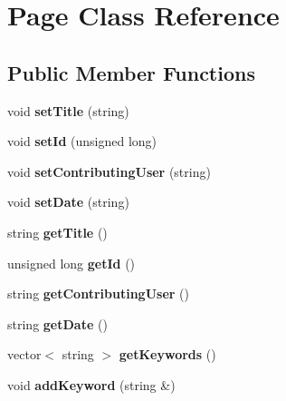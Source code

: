 \hypertarget{class_page}{\section{Page Class Reference}
\label{class_page}
}
\subsection*{Public Member Functions}
\begin{DoxyCompactItemize}
\item 
\hypertarget{class_page_acf477f6eb17bab9955041f62cf773e8d}{void {\bfseries set\+Title} (string)}\label{class_page_acf477f6eb17bab9955041f62cf773e8d}

\item 
\hypertarget{class_page_ac482ec0d499e8c4d61f65bec3c845e05}{void {\bfseries set\+Id} (unsigned long)}\label{class_page_ac482ec0d499e8c4d61f65bec3c845e05}

\item 
\hypertarget{class_page_aa035203c86eb29a7121987ef5bfa1faf}{void {\bfseries set\+Contributing\+User} (string)}\label{class_page_aa035203c86eb29a7121987ef5bfa1faf}

\item 
\hypertarget{class_page_a12df427d5f2620b2e912590eb1c81d32}{void {\bfseries set\+Date} (string)}\label{class_page_a12df427d5f2620b2e912590eb1c81d32}

\item 
\hypertarget{class_page_ad8984dc2ec1c9d62343e35724080ee46}{string {\bfseries get\+Title} ()}\label{class_page_ad8984dc2ec1c9d62343e35724080ee46}

\item 
\hypertarget{class_page_a8ce274bdff4b0f02131b0142dfd38dde}{unsigned long {\bfseries get\+Id} ()}\label{class_page_a8ce274bdff4b0f02131b0142dfd38dde}

\item 
\hypertarget{class_page_aa21e1e663df6f64d0670f4f9ac97330c}{string {\bfseries get\+Contributing\+User} ()}\label{class_page_aa21e1e663df6f64d0670f4f9ac97330c}

\item 
\hypertarget{class_page_aa9f674aaecb16f3ef02d54d0e42abe49}{string {\bfseries get\+Date} ()}\label{class_page_aa9f674aaecb16f3ef02d54d0e42abe49}

\item 
\hypertarget{class_page_a31af27b5aa8f44f6bfb95fdbf555477c}{vector$<$ string $>$ {\bfseries get\+Keywords} ()}\label{class_page_a31af27b5aa8f44f6bfb95fdbf555477c}

\item 
\hypertarget{class_page_a769e83dcf803821bd88be6211a79c282}{void {\bfseries add\+Keyword} (string \&)}\label{class_page_a769e83dcf803821bd88be6211a79c282}

\end{DoxyCompactItemize}
